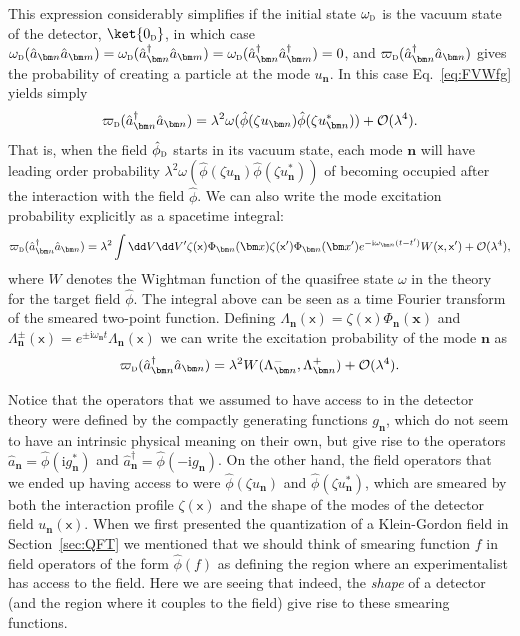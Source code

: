 \documentclass[letterpaper,12pt,titlepage,oneside,final]{book}
\newcommand{\mf}{\mathsf}%
\newcommand{\ii}{\mathrm{i}}
\newcommand{\tc}[1]{\textsc{#1}}
\begin{document}
This expression considerably simplifies if the initial state $\omega_\tc{d}$ is the vacuum state of the detector, $\ket{0_\tc{d}}$, in which case $\omega_\tc{d}(\hat{a}_{\bm n} \hat{a}_{\bm m}) = \omega_\tc{d}(\hat{a}_{\bm n}^\dagger \hat{a}_{\bm m}) = \omega_\tc{d}(\hat{a}_{\bm n}^\dagger \hat{a}_{\bm m}^\dagger) = 0$, and $\varpi_\tc{d}(\hat{a}_{\bm n}^\dagger \hat{a}_{\bm n})$ gives the probability of creating a particle at the mode $u_{\bm n}$. In this case Eq.~\eqref{eq:FVWfg} yields simply
\begin{equation}\label{eq:omegadanand}
    \varpi_{\tc{d}}(\hat{a}_{\bm n}^\dagger \hat{a}_{\bm n}) = \lambda^2 \omega(\hat{\phi}(\zeta u_{\bm n})\hat{\phi}(\zeta u_{\bm n}^*)) + \mathcal{O}(\lambda^4).
\end{equation}
That is, when the field $\hat{\phi}_\tc{d}$ starts in its vacuum state, each mode $\bm n$ will have leading order probability $\lambda^2 \omega(\hat{\phi}(\zeta u_{\bm n})\hat{\phi}(\zeta u_{\bm n}^*))$ of becoming occupied after the interaction with the field $\hat{\phi}$. We can also write the mode excitation probability explicitly as a spacetime integral:
\begin{equation}\label{eq:exProbV}
    \varpi_{\tc{d}}(\hat{a}_{\bm n}^\dagger \hat{a}_{\bm n}) =  \lambda^2\int \dd V \dd V' \zeta(\mf x) \Phi_{\bm n}(\bm x)\zeta(\mf x') \Phi_{\bm n}(\bm x') e^{- \ii \omega_{\bm n}(t-t')}W(\mf x, \mf x') + \mathcal{O}(\lambda^4),
\end{equation}
where $W$ denotes the Wightman function of the quasifree state $\omega$ in the theory for the target field $\hat{\phi}$. The integral above can be seen as a time Fourier transform of the smeared two-point function. Defining $\Lambda_{\bm n}(\mf x) = \zeta(\mf x) \Phi_{\bm n}(\bm x)$ and $\Lambda_{\bm n}^\pm(\mf x) = e^{\pm \ii \omega_{\bm n}t}\Lambda_{\bm n}(\mf x)$ we can write the excitation probability of the mode $\bm n$ as
\begin{equation}
    \varpi_{\tc{d}}(\hat{a}_{\bm n}^\dagger \hat{a}_{\bm n}) = \lambda^2 W(\Lambda_{\bm n}^-,\Lambda_{\bm n}^+) + \mathcal{O}(\lambda^4).
\end{equation}

Notice that the operators that we assumed to have access to in the detector theory were defined by the compactly generating functions $g_{\bm n}$, which do not seem to have an intrinsic physical meaning on their own, but give rise to the operators $\hat{a}_{\bm n} = \hat{\phi}(\ii g_{\bm n}^*)$ and $\hat{a}_{\bm n}^\dagger = \hat{\phi}(-\ii g_{\bm n})$. On the other hand, the field operators that we ended up having access to were $\hat{\phi}(\zeta u_{\bm n})$ and $\hat{\phi}(\zeta u_{\bm n}^*)$, which are smeared by both the interaction profile $\zeta(\mf x)$ and the shape of the modes of the detector field $u_{\bm n}(\mf x)$. When we first presented the quantization of a Klein-Gordon field in Section~\ref{sec:QFT} we mentioned that we should think of smearing function $f$ in field operators of the form $\hat{\phi}(f)$ as defining the region where an experimentalist has access to the field. Here we are seeing that indeed, the \textit{shape} of a detector (and the region where it couples to the field) give rise to these smearing functions.
\end{document}

